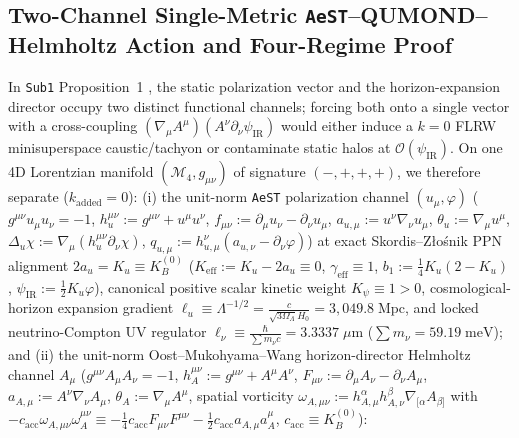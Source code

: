 \documentclass[11pt,a4paper]{article}
\begin{document}
\subsection{Two-Channel Single-Metric \texttt{AeST}--QUMOND--Helmholtz Action and Four-Regime Proof}
In {\upshape\texttt{Sub1}} Proposition~1 \cite{Olcsak2026Sub1}, the static polarization vector and the horizon-expansion director occupy two distinct functional channels; forcing both onto a single vector with a cross-coupling $(\nabla_\mu A^\mu)(A^\nu\partial_\nu\psi_{\mathrm{IR}})$ would either induce a $k = 0$ FLRW minisuperspace caustic/tachyon or contaminate static halos at $\mathcal{O}(\psi_{\mathrm{IR}})$. On one 4D Lorentzian manifold $(\mathcal{M}_4, g_{\mu\nu})$ of signature $(-,+,+,+)$, we therefore separate ($k_{\mathrm{added}} = 0$): (i) the unit-norm \texttt{AeST} polarization channel $(u_\mu, \varphi)$ \cite{SkordisZlosnik2021} ($g^{\mu\nu}u_\mu u_\nu = -1$, $h_u^{\mu\nu} := g^{\mu\nu} + u^\mu u^\nu$, $f_{\mu\nu} := \partial_\mu u_\nu - \partial_\nu u_\mu$, $a_{u,\mu} := u^\nu\nabla_\nu u_\mu$, $\theta_u := \nabla_\mu u^\mu$, $\Delta_u\chi := \nabla_\mu(h_u^{\mu\nu}\partial_\nu\chi)$, $q_{u,\mu} := h_{u,\mu}^\nu(a_{u,\nu} - \partial_\nu\varphi)$) at exact Skordis--Z\l{}o\'snik PPN alignment $2a_u = K_u \equiv K_B^{(0)}$ ($K_{\mathrm{eff}} := K_u - 2a_u \equiv 0$, $\gamma_{\mathrm{eff}} \equiv 1$, $b_1 := \frac{1}{4}K_u(2 - K_u)$, $\psi_{\mathrm{IR}} := \frac{1}{2}K_u\varphi$), canonical positive scalar kinetic weight $K_\psi \equiv 1 > 0$, cosmological-horizon expansion gradient $\ell_u \equiv \Lambda^{-1/2} = \frac{c}{\sqrt{3\Omega_\Lambda}H_0} = 3{,}049.8\;\mathrm{Mpc}$, and locked neutrino-Compton UV regulator $\ell_\nu \equiv \frac{\hbar}{\sum m_\nu c} = 3.3337\;\mu\mathrm{m}$ ($\sum m_\nu = 59.19\;\mathrm{meV}$); and (ii) the unit-norm Oost--Mukohyama--Wang \cite{OostMukohyamaWang2018} horizon-director Helmholtz channel $A_\mu$ ($g^{\mu\nu}A_\mu A_\nu = -1$, $h_A^{\mu\nu} := g^{\mu\nu} + A^\mu A^\nu$, $F_{\mu\nu} := \partial_\mu A_\nu - \partial_\nu A_\mu$, $a_{A,\mu} := A^\nu\nabla_\nu A_\mu$, $\theta_A := \nabla_\mu A^\mu$, spatial vorticity $\omega_{A,\mu\nu} := h_{A,\mu}^\alpha h_{A,\nu}^\beta\nabla_{[\alpha}A_{\beta]}$ with $-c_{\mathrm{acc}}\omega_{A,\mu\nu}\omega_A^{\mu\nu} \equiv -\frac{1}{4}c_{\mathrm{acc}}F_{\mu\nu}F^{\mu\nu} - \frac{1}{2}c_{\mathrm{acc}}a_{A,\mu}a_A^\mu$, $c_{\mathrm{acc}} \equiv K_B^{(0)}$):
\end{document}
